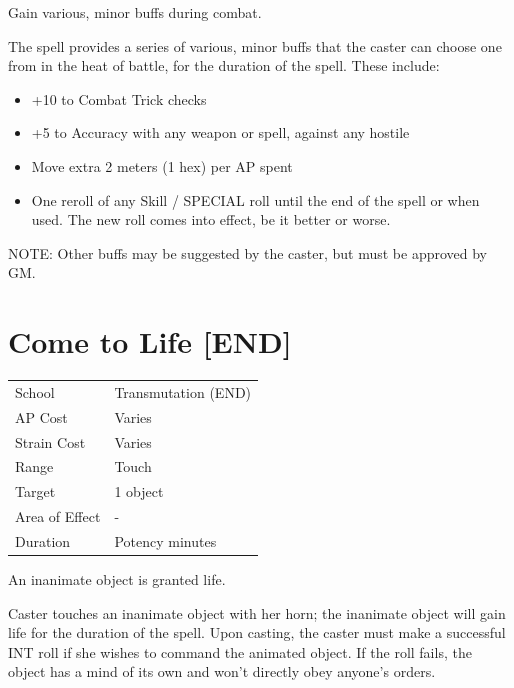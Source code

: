 \documentclass[11pt,a4paper,twocolumn]{book}
\begin{document}
\medskip

Gain various, minor buffs during combat.

The spell provides a series of various, minor buffs that the caster can choose one from in the heat of battle, for the duration of the spell. These include:

\begin{itemize}
  \item +10 to Combat Trick checks
  \item +5 to Accuracy with any weapon or spell, against any hostile	
  \item Move extra 2 meters (1 hex) per AP spent
  \item One reroll of any Skill / SPECIAL roll until the end of the spell or when used. The new roll comes into effect, be it better or worse.
\end{itemize}
   
NOTE: Other buffs may be suggested by the caster, but must be approved by GM.


\section*{Come to Life [END]}
{
	\begin{tabu} to 75mm{| X[l,4] | X[l,7] |}
		\hline
		School 			& Transmutation (END) 	\\
        AP Cost	      	& Varies 				\\
        Strain Cost     & Varies 				\\
        Range     		& Touch 				\\
        Target      	& 1 object 				\\
        Area of Effect  & - 	 				\\
        Duration     	& Potency minutes 		\\ \hline
	\end{tabu}
		
}

\medskip

An inanimate object is granted life.

Caster touches an inanimate object with her horn; the inanimate object will gain life for the duration of the spell. Upon casting, the caster must make a successful INT roll if she wishes to command the animated object. If the roll fails, the object has a mind of its own and won't directly obey anyone's orders.
\end{document}

